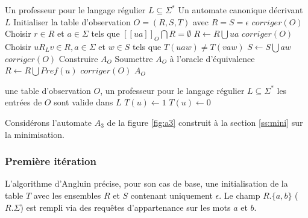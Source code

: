 \begin{algo}\label{alg:angluin}
  \begin{algorithmic}[1]
    \REQUIRE Un professeur pour le langage régulier $L\subseteq\Sigma^*$
		\ENSURE Un automate canonique décrivant $L$
		\STATE Initialiser la table d'observation $O=(R,S,T)$ avec $R=S={\epsilon}$
		\STATE $corriger(O)$
		\REPEAT
					\STATE Choisir $r\in R$ et $a\in\Sigma$ tels que $[[ua]]_O\bigcap R=\emptyset$
					\STATE $R\leftarrow R\bigcup {ua}$
					\STATE $corriger(O)$
				\ENDIF
					\STATE Choisir $uR_Lv \in R, a\in\Sigma$ et $w\in S$ tels que $T(uaw)\neq T(vaw)$
					\STATE $S\leftarrow S \bigcup {aw}$
					\STATE $corriger(O)$
				\ENDIF
			\ENDWHILE
			\STATE Construire $A_O$
			\STATE Soumettre $A_O$ à l'oracle d'équivalence
				\STATE $R\leftarrow R\bigcup Pref(u)$
				\STATE $corriger(O)$
			\ENDIF
		\RETURN $A_O$
  \end{algorithmic}
\end{algo}

\begin{algo}[$corriger(O)$]\label{alg:corr}
  \begin{algorithmic}[1]
		\REQUIRE une table d'observation $O$, un professeur pour le langage régulier $L\subseteq\Sigma^*$
		\ENSURE les entrées de $O$ sont valide dans $L$
				\STATE $T(u)\leftarrow 1$
			\ELSE
				\STATE $T(u)\leftarrow 0$
			\ENDIF
		\ENDFOR
	\end{algorithmic}
\end{algo}

Considérons l'automate $A_3$ de la figure \ref{fig:a3} construit à la section \ref{ss:mini} sur la minimisation.


\subsubsection{Première itération}

L'algorithme d'Angluin précise, pour son cas de base, une initialisation de la table $T$ avec les ensembles $R$ et $S$ contenant uniquement $\epsilon$. Le champ $R.\{a,b\}$ ($R.\Sigma$) est rempli via des requêtes d'appartenance sur les mots $a$ et $b$.

